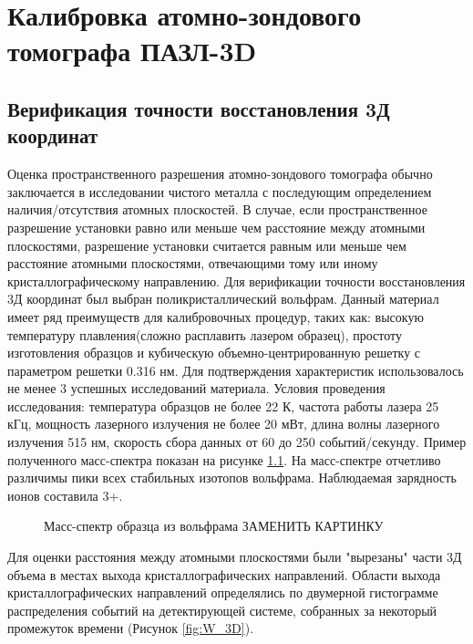 \chapter{Калибровка атомно-зондового томографа ПАЗЛ-3D}\label{ch:ch3}

\section{Верификация точности восстановления 3Д координат}\label{sec:ch3/sect1}

Оценка пространственного разрешения атомно-зондового томографа обычно заключается в исследовании чистого металла с последующим определением наличия/отсутствия атомных плоскостей. В случае, если пространственное разрешение установки равно или меньше чем расстояние между атомными плоскостями, разрешение установки считается равным или меньше чем расстояние атомными плоскостями, отвечающими тому или иному кристаллографическому направлению. Для верификации точности восстановления 3Д координат был выбран поликристаллический вольфрам\cite{scbibAPPLE}. Данный материал имеет ряд преимуществ для калибровочных процедур, таких как: высокую температуру плавления(сложно расплавить лазером образец), простоту изготовления образцов и кубическую объемно-центрированную решетку с параметром решетки 0.316 нм. Для подтверждения характеристик использовалось не менее 3 успешных исследований материала. Условия проведения исследования: температура образцов не более 22 К, частота работы лазера 25 кГц, мощность лазерного излучения не более 20 мВт, длина волны лазерного излучения 515 нм, скорость сбора данных от 60 до 250 событий/секунду. Пример полученного масс-спектра показан на рисунке \cref{fig:W_massspectr}. На масс-спектре отчетливо различимы пики всех стабильных изотопов вольфрама. Наблюдаемая зарядность ионов составила 3+. 

\begin{figure}[htb]
	\caption{Масс-спектр образца из вольфрама ЗАМЕНИТЬ КАРТИНКУ}
	\label{fig:W_massspectr}
\end{figure}

Для оценки расстояния между атомными плоскостями были "вырезаны" части 3Д объема в местах выхода кристаллографических направлений. Области выхода кристаллографических направлений определялись по двумерной гистограмме распределения событий на детектирующей системе, собранных за некоторый промежуток времени (Рисунок \cref{fig:W_3D}).

